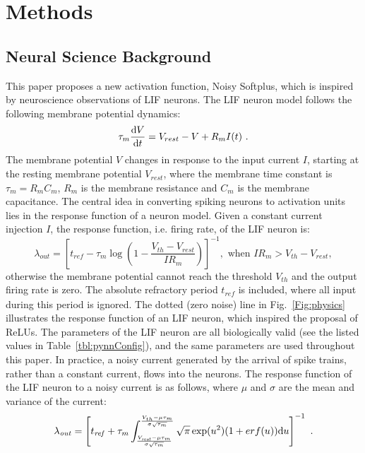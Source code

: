 \section{Methods}
	\subsection{Neural Science Background}
	This paper proposes a new activation function, Noisy Softplus, which is inspired by neuroscience observations of LIF neurons.
	The LIF neuron model follows the following membrane potential dynamics:
	\begin{equation}
	\tau_m \frac{\mathrm{d} V}{\mathrm{d} t}=V_{rest} - V + R_{m} I(t) ~.
	\label{eq:LIF}
	\end{equation}
	The membrane potential $V$ changes in response to the input current $I$, starting at the resting membrane potential $V_{rest}$, where the membrane time constant is $\tau_m = R_mC_m$, $R_m$ is the membrane resistance and $C_m$ is the membrane capacitance.
	The central idea in converting spiking neurons to activation units lies in the response function of a neuron model.
	Given a constant current injection $I$, the response function, i.e. firing rate, of the LIF neuron is:
	\begin{equation}
	\lambda_\mathit{out}=
	\left [ t_\mathit{ref}-\tau_m\log \left ( 1-\frac{V_{th}-V_\mathit{rest}}{IR_m}  \right )\right ]^{-1}, \textrm{~when~} IR_m>V_{th}-V_{rest},
	\label{equ:consI}
	\end{equation}
	otherwise the membrane potential cannot reach the threshold $V_{th}$ and the output firing rate is zero. 
	The absolute refractory period $t_\mathit{ref}$ is included, where all input during this period is ignored.
	The dotted (zero noise) line in Fig.~\ref{Fig:physics} illustrates the response function of an LIF neuron, which inspired the proposal of ReLUs.
	The parameters of the LIF neuron are all biologically valid (see the listed values in Table~\ref{tbl:pynnConfig}), and the same parameters are used throughout this paper.
	In practice, a noisy current generated by the arrival of spike trains, rather than a constant current, flows into the neurons.
	The response function
	of the LIF neuron to a noisy current is as follows, where $\mu$ and $\sigma$ are the mean and variance of the current:
	\begin{equation}
	\lambda_\mathit{out}=
	\left [ t_\mathit{ref}+\tau_m \int_{\frac{V_\mathit{rest}-\mu \tau_m }{\sigma \sqrt{\tau_m}}}^{\frac{V_{th}-\mu \tau_m }{\sigma \sqrt{\tau_m}}} \sqrt{\pi} \exp(u^{2}) (1+erf(u)) \mathrm{d} u \right ]^{-1} ~.
	\label{equ:noiseI}
	\end{equation}
	
